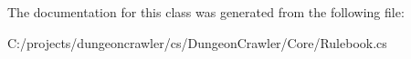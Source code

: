 The documentation for this class was generated from the following file\+:\begin{DoxyCompactItemize}
\item 
C\+:/projects/dungeoncrawler/cs/\+Dungeon\+Crawler/\+Core/Rulebook.\+cs\end{DoxyCompactItemize}
